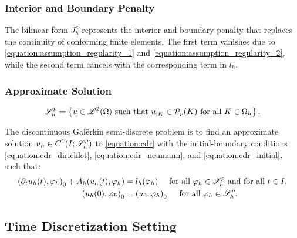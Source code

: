 \newpage
\subsubsection{Interior and Boundary Penalty}

The bilinear form $J^{\kappa}_h$ represents the interior and boundary penalty that replaces the continuity of conforming finite elements. The first term vanishes due to \cref{equation:assumption_regularity_1} and \cref{equation:assumption_regularity_2}, while the second term cancels with the corresponding term in $l_h$.

\subsubsection{Approximate Solution}

\begin{definition}[$\SpaceSolution_h^p$]
    \begin{gather}
        \mathscr{S}_h^p = \left\{ u \in \mathscr{L}^{2}(\Omega) \text{ such that } u_{\mid K} \in \mathcal{P}_{p}(K) \text{ for all } K \in \Omega_h \right\}.
    \end{gather}
\end{definition}

The discontinuous Galërkin semi-discrete problem is to find an approximate solution $u_h \in C^1(I; \mathscr{S}_h^p)$ to \cref{equation:cdr} with the initial-boundary conditions \cref{equation:cdr_dirichlet}, \cref{equation:cdr_neumann}, and \cref{equation:cdr_initial}, such that:
\begin{align}
    \left( \partial_t u_h(t), \varphi_h \right)_0 + A_h(u_h(t), \varphi_h) &= l_h(\varphi_h) \quad \text{ for all } \varphi_h \in \mathscr{S}_h^p \text{ and for all } t \in I, \\
    \left( u_h(0), \varphi_h \right)_0 &= \left( u_0, \varphi_h \right)_0 \quad \text{ for all } \varphi_h \in \mathscr{S}_h^p.
\end{align}

\newpage
\subsection{Time Discretization Setting}

